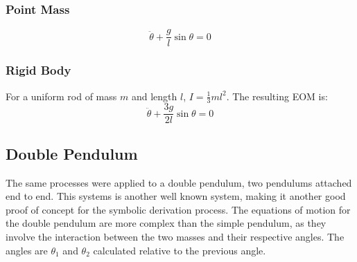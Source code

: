 \documentclass[final,onecolumn]{IEEEtran}
\begin{document}
\subsubsection*{Point Mass}
\begin{equation}
    \label{eq:pendulum_point_mass}
    \ddot{\theta} + \frac{g}{l} \sin\theta = 0
\end{equation}

\subsubsection*{Rigid Body}
For a uniform rod of mass $m$ and length $l$, $I = \frac{1}{3}ml^2$. The resulting EOM is:
\begin{equation}
    \label{eq:pendulum_rigid_body}
    \ddot{\theta} + \frac{3g}{2l} \sin\theta = 0
\end{equation}

\subsection{Double Pendulum}\label{app:double_pendulum}
The same processes were applied to a double pendulum, two pendulums attached end to end. This systems is another well known system, making it another good proof of concept for the symbolic derivation process. The equations of motion for the double pendulum are more complex than the simple pendulum, as they involve the interaction between the two masses and their respective angles. The angles are $\theta_1$ and $\theta_2$ calculated relative to the previous angle.
\end{document}
